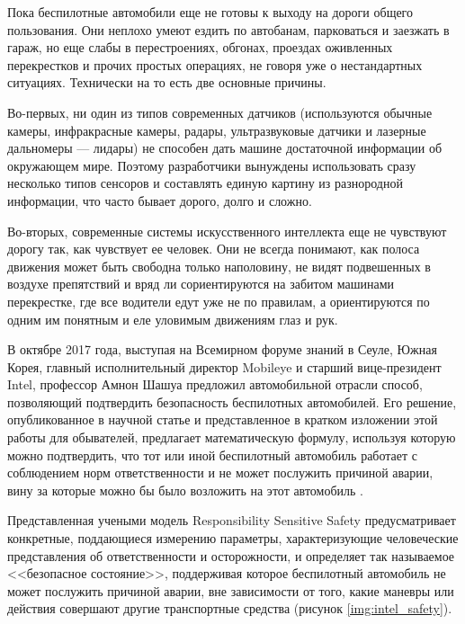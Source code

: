Пока беспилотные автомобили еще не готовы к выходу на дороги общего пользования. Они 
неплохо умеют ездить по автобанам, парковаться и заезжать в гараж, но еще слабы 
в перестроениях, обгонах, проездах оживленных перекрестков и прочих простых 
операциях, не говоря уже о нестандартных ситуациях. Технически на то есть две 
основные причины.

Во-первых, ни один из типов современных датчиков (используются 
обычные камеры, инфракрасные камеры, радары, ультразвуковые датчики и лазерные 
дальномеры — лидары) не способен дать машине достаточной информации об 
окружающем мире. Поэтому разработчики вынуждены использовать сразу несколько 
типов сенсоров и составлять единую картину из разнородной информации, что часто 
бывает дорого, долго и сложно.

Во-вторых, современные системы искусственного интеллекта еще не чувствуют 
дорогу так, как чувствует ее человек. Они не всегда понимают, как полоса 
движения может быть свободна только наполовину, не видят подвешенных в воздухе 
препятствий и вряд ли сориентируются на забитом машинами перекрестке, где все 
водители едут уже не по правилам, а ориентируются по одним им понятным и еле 
уловимым движениям глаз и рук.


В октябре 2017 года, выступая на Всемирном форуме знаний в Сеуле, Южная Корея, 
главный исполнительный директор Mobileye и старший вице-президент Intel, 
профессор Амнон Шашуа предложил автомобильной отрасли способ, 
позволяющий подтвердить безопасность беспилотных автомобилей. Его решение, 
опубликованное в научной статье и представленное в кратком изложении этой 
работы для обывателей, предлагает математическую формулу, используя которую 
можно подтвердить, что тот или иной беспилотный автомобиль работает с 
соблюдением норм ответственности и не может послужить причиной аварии, вину за 
которые можно бы было возложить на этот автомобиль \cite{Intel_Safety}.

Представленная учеными модель Responsibility Sensitive Safety предусматривает 
конкретные, поддающиеся измерению параметры, характеризующие человеческие 
представления об ответственности и осторожности, и определяет так называемое 
<<безопасное состояние>>, поддерживая которое беспилотный автомобиль 
не может послужить причиной аварии, вне зависимости от того, какие маневры или 
действия совершают другие транспортные средства (рисунок \ref{img:intel_safety}).


